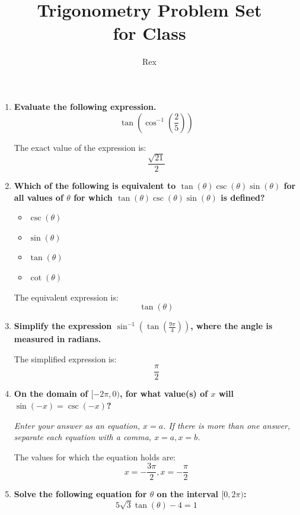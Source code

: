 \documentclass[12pt]{article}
\title{
    \vspace{2in}
    \textbf{Trigonometry Problem Set}\\
    \vspace{0.1in}
    \large for Class\\
    \vspace{3in}
}
\author{Rex}
\date{}
\begin{document}
\maketitle
\newpage

\begin{enumerate}
    
    
    \item \textbf{Evaluate the following expression.}
    \[ \tan(\cos^{-1}(\frac{2}{5})) \]
    
    The exact value of the expression is:
    \[ \frac{\sqrt{21}}{2} \]
    \vspace{45mm}
    \item \textbf{Which of the following is equivalent to \( \tan(\theta) \csc(\theta) \sin(\theta) \) for all values of \( \theta \) for which \( \tan(\theta) \csc(\theta) \sin(\theta) \) is defined?}
    
    \begin{itemize}
        \item \( \csc(\theta) \)
        \item \( \sin(\theta) \)
        \item \( \tan(\theta) \)
        \item \( \cot(\theta) \)
    \end{itemize}
    
    The equivalent expression is:
    \[ \tan(\theta) \]
    \vspace{45mm}
   \newpage 
    \item \textbf{Simplify the expression \( \sin^{-1}(\tan(\frac{9\pi}{4})) \), where the angle is measured in radians.}
    
    The simplified expression is:
    \[ \frac{\pi}{2} \]
    \vspace{45mm}

    \item \textbf{On the domain of \( [-2\pi, 0) \), for what value(s) of \( x \) will \( \sin(-x) = \csc(-x) \)?}
    
    \textit{Enter your answer as an equation, \( x=a \). If there is more than one answer, separate each equation with a comma, \( x=a, x=b \).}
    
    The values for which the equation holds are:
    \[ x = -\frac{3\pi}{2}, x = -\frac{\pi}{2} \]
    \vspace{45mm}
    \newpage
    \item \textbf{Solve the following equation for \( \theta \) on the interval \( [0,2\pi) \):}
    \[ 5\sqrt{3} \tan(\theta) - 4 = 1 \]
    

\end{enumerate}
\end{document}

